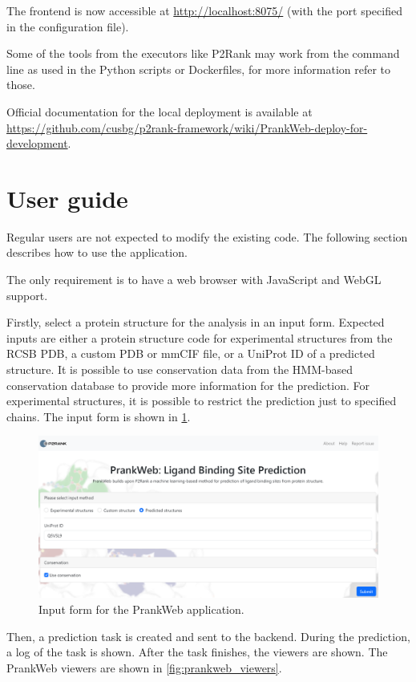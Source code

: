 The frontend is now accessible at \url{http://localhost:8075/} (with the port specified in the configuration file).

Some of the tools from the executors like P2Rank may work from the command line as used in the Python scripts or Dockerfiles, for more information refer to those.

Official documentation for the local deployment is available at \url{https://github.com/cusbg/p2rank-framework/wiki/PrankWeb-deploy-for-development}.


\section{User guide}
\label{sec:user_guide}

Regular users are not expected to modify the existing code. The following section describes how to use the application.

The only requirement is to have a web browser with JavaScript and WebGL support.

Firstly, select a protein structure for the analysis in an input form. Expected inputs are either a protein structure code for experimental structures from the RCSB PDB, a custom PDB or mmCIF file, or a UniProt ID of a predicted structure. It is possible to use conservation data from the HMM-based conservation database to provide more information for the prediction. For experimental structures, it is possible to restrict the prediction just to specified chains. The input form is shown in \cref{fig:input_form}.

\begin{figure}[ht]
    \centering
    \includegraphics[width=\textwidth]{img/pw_introsite.png}
    \caption{Input form for the PrankWeb application.}
    \label{fig:input_form}
\end{figure}

Then, a prediction task is created and sent to the backend. During the prediction, a log of the task is shown. After the task finishes, the viewers are shown. The PrankWeb viewers are shown in \cref{fig:prankweb_viewers}.

